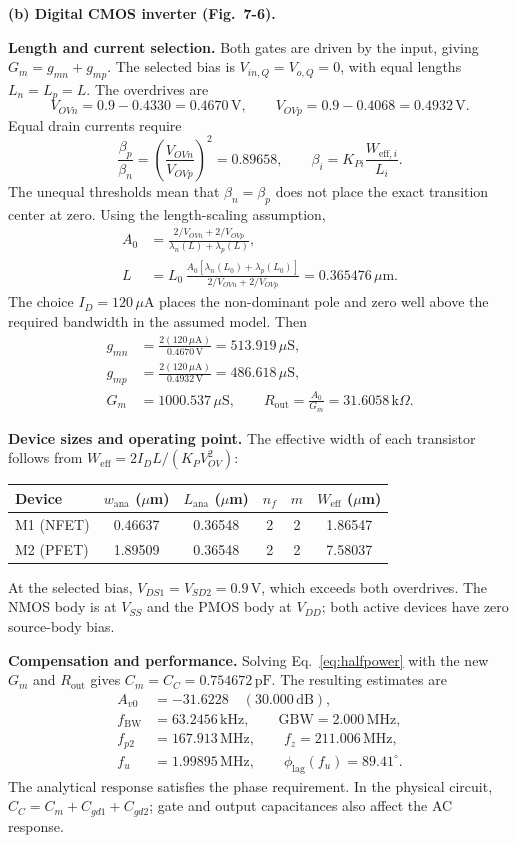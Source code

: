 \documentclass[12pt,letterpaper]{article}
\newcommand{\um}{\,\mu\mathrm{m}}
\newcommand{\uA}{\,\mu\mathrm{A}}
\newcommand{\uS}{\,\mu\mathrm{S}}
\newcommand{\kohm}{\,\mathrm{k}\Omega}
\newcommand{\V}{\,\mathrm{V}}
\newcommand{\MHz}{\,\mathrm{MHz}}
\newcommand{\kHz}{\,\mathrm{kHz}}
\newcommand{\pF}{\,\mathrm{pF}}
\begin{document}
\begin{enumerate}
\newpage
\textbf{(b) Digital CMOS inverter (Fig.~7-6).}

\textbf{Length and current selection.}
Both gates are driven by the input, giving
$G_m=g_{mn}+g_{mp}$.
The selected bias is $V_{in,Q}=V_{o,Q}=0$, with equal lengths $L_n=L_p=L$.
The overdrives are
\[
V_{OVn}=0.9-0.4330=0.4670\V,\qquad
V_{OVp}=0.9-0.4068=0.4932\V.
\]
Equal drain currents require
\[
\frac{\beta_p}{\beta_n}
=\left(\frac{V_{OVn}}{V_{OVp}}\right)^2=0.89658,
\qquad \beta_i=K_{Pi}\frac{W_{\mathrm{eff},i}}{L_i}.
\]
The unequal thresholds mean that $\beta_n=\beta_p$ does not
place the exact transition center at zero.
Using the length-scaling assumption,
\begin{align*}
A_0&=\frac{2/V_{OVn}+2/V_{OVp}}{\lambda_n(L)+\lambda_p(L)},\\
L&=L_0\,
\frac{A_0[\lambda_n(L_0)+\lambda_p(L_0)]}
{2/V_{OVn}+2/V_{OVp}}
=0.365476\um.
\end{align*}
The choice $I_D=120\uA$ places the non-dominant pole and zero
well above the required bandwidth in the assumed model.
Then
\begin{align*}
g_{mn}&=\frac{2(120\uA)}{0.4670\V}=513.919\uS,\\
g_{mp}&=\frac{2(120\uA)}{0.4932\V}=486.618\uS,\\
G_m&=1000.537\uS,\qquad
R_{\mathrm{out}}=\frac{A_0}{G_m}=31.6058\kohm.
\end{align*}

\textbf{Device sizes and operating point.}
The effective width of each transistor follows from
$W_{\mathrm{eff}}=2I_DL/(K_PV_{OV}^2)$:
\begin{center}
\small
\begin{tabular}{@{}lccccc@{}}
\toprule
Device & $w_{\mathrm{ana}}$ ($\mu$m) & $L_{\mathrm{ana}}$ ($\mu$m) & $n_f$ & $m$ & $W_{\mathrm{eff}}$ ($\mu$m)\\
\midrule
M1 (NFET) & 0.46637 & 0.36548 & 2 & 2 & 1.86547\\
M2 (PFET) & 1.89509 & 0.36548 & 2 & 2 & 7.58037\\
\bottomrule
\end{tabular}
\end{center}
At the selected bias, $V_{DS1}=V_{SD2}=0.9\V$, which exceeds
both overdrives. The NMOS body is at $V_{SS}$ and the PMOS
body at $V_{DD}$; both active devices have zero source-body bias.

\textbf{Compensation and performance.}
Solving Eq.~\eqref{eq:halfpower} with the new $G_m$ and
$R_{\mathrm{out}}$ gives $C_m=C_C=0.754672\pF$.
The resulting estimates are
\begin{align*}
A_{v0}&=-31.6228\quad(30.000\,\mathrm{dB}),\\
f_{\mathrm{BW}}&=63.2456\kHz,\qquad \mathrm{GBW}=2.000\MHz,\\
f_{p2}&=167.913\MHz,\qquad f_z=211.006\MHz,\\
f_u&=1.99895\MHz,\qquad \phi_{\mathrm{lag}}(f_u)=89.41^\circ.
\end{align*}
The analytical response satisfies the phase requirement.
In the physical circuit, $C_C=C_m+C_{gd1}+C_{gd2}$; gate and
output capacitances also affect the AC response.


\end{enumerate}
\end{document}
